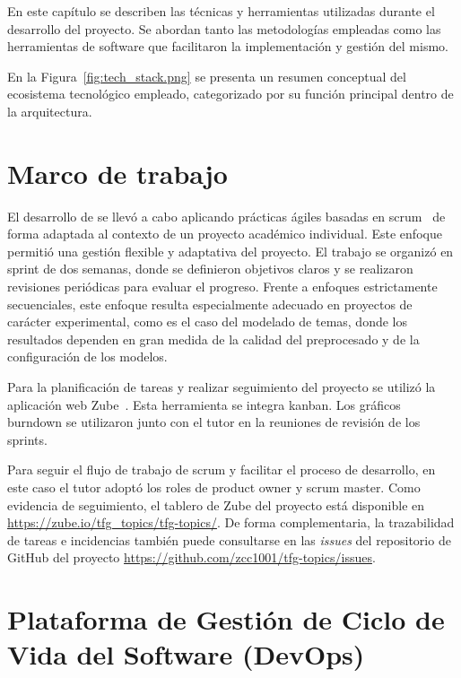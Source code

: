 
En este capítulo se describen las técnicas y herramientas utilizadas durante el
desarrollo del proyecto. Se abordan tanto las metodologías empleadas como las
herramientas de software que facilitaron la implementación y gestión del mismo.

En la Figura~\ref{fig:tech_stack.png} se presenta un resumen conceptual del
ecosistema tecnológico empleado, categorizado por su función principal dentro
de la arquitectura.


\section{Marco de trabajo}

El desarrollo de \nombreProyecto{} se llevó a cabo aplicando prácticas ágiles
basadas en \acrfull{scrum}~\cite{agile_alliance} de forma adaptada al contexto
de un proyecto académico individual. Este enfoque permitió una gestión flexible
y adaptativa del proyecto. El trabajo se organizó en \gls{sprint} de dos
semanas, donde se definieron objetivos claros y se realizaron revisiones
periódicas para evaluar el progreso. Frente a enfoques estrictamente
secuenciales, este enfoque resulta especialmente adecuado en proyectos de
carácter experimental, como es el caso del modelado de temas, donde los
resultados dependen en gran medida de la calidad del preprocesado y de la
configuración de los modelos.

Para la planificación de tareas y realizar seguimiento del proyecto se utilizó
la aplicación web Zube~\cite{zube}. Esta herramienta se integra \gls{kanban}.
Los gráficos burndown se utilizaron junto con el tutor en la reuniones de
revisión de los sprints.

Para seguir el flujo de trabajo de \acrshort{scrum} y facilitar el proceso de
desarrollo, en este caso el tutor adoptó los roles de product owner y
\acrshort{scrum} master. Como evidencia de seguimiento, el tablero de Zube del
proyecto está disponible en \url{https://zube.io/tfg_topics/tfg-topics/}. De
forma complementaria, la trazabilidad de tareas e incidencias también puede
consultarse en las \textit{issues} del repositorio de GitHub del proyecto
\url{https://github.com/zcc1001/tfg-topics/issues}.

\section{ Plataforma de Gestión de Ciclo de Vida del Software (DevOps)}

